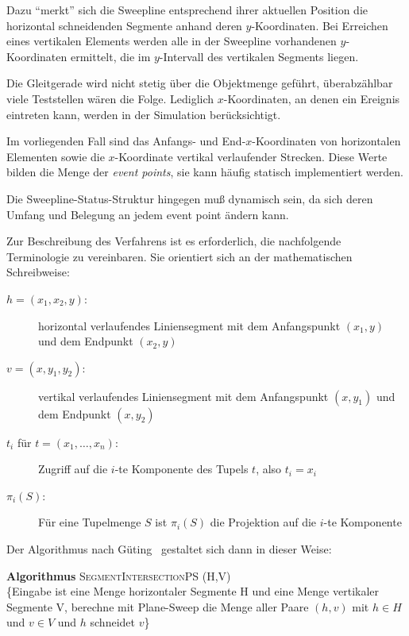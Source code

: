 \documentclass{scrreprt}%
\theoremstyle{break}
\begin{document}
Dazu "`merkt"' sich die Sweepline entsprechend ihrer aktuellen
Position die horizontal schneidenden Segmente anhand deren
$y$-Koordinaten. Bei Erreichen eines vertikalen Elements
werden alle in der Sweepline vorhandenen $y$-Koordinaten
ermittelt, die im $y$-Intervall des vertikalen Segments
liegen.

Die Gleitgerade wird nicht stetig über die Objektmenge
geführt, überabzählbar viele Teststellen wären die Folge. 
Lediglich $x$-Koordinaten, an denen ein Ereignis
eintreten kann, werden in der Simulation berücksichtigt.

Im vorliegenden Fall sind das Anfangs- und End-$x$-Koordinaten von
horizontalen Elementen sowie die $x$-Koordinate 
vertikal verlaufender Strecken. Diese Werte bilden die Menge
der \textit{event points}, sie kann häufig statisch implementiert werden.

Die Sweepline-Status-Struktur hingegen muß dynamisch sein, da sich
deren Umfang und Belegung an jedem event point ändern kann.

Zur Beschreibung des Verfahrens ist es erforderlich, die nachfolgende
Terminologie zu vereinbaren. Sie orientiert sich an der mathematischen
Schreibweise:

\begin{description}

\item[$h=(x_1,x_2,y)$:] horizontal verlaufendes Liniensegment mit dem
    Anfangspunkt $(x_1,y)$ und dem Endpunkt $(x_2,y)$
\item[$v=(x,y_1,y_2)$:] vertikal verlaufendes Liniensegment mit dem
    Anfangspunkt $(x,y_1)$ und dem Endpunkt $(x,y_2)$
\item[$t_i$ für $t=(x_1,\dots,x_n)$:] Zugriff auf die $i$-te Komponente des 
   Tupels $t$, also $t_i=x_i$
\item[$\pi_i(S)$:] Für eine Tupelmenge $S$ ist $\pi_i(S)$ die Projektion
   auf die $i$-te Komponente
\end{description} 

Der Algorithmus nach Güting~\cite{guting} gestaltet sich dann in dieser Weise:

\textbf{Algorithmus} \textsc{SegmentIntersectionPS (H,V)}\\
\{Eingabe ist eine Menge horizontaler Segmente H und eine Menge vertikaler
 Segmente V, berechne mit Plane-Sweep die Menge aller Paare $(h,v)$
mit $h{\in}H$ und $v{\in}V$ und $h$ schneidet $v$\}
\end{document}
